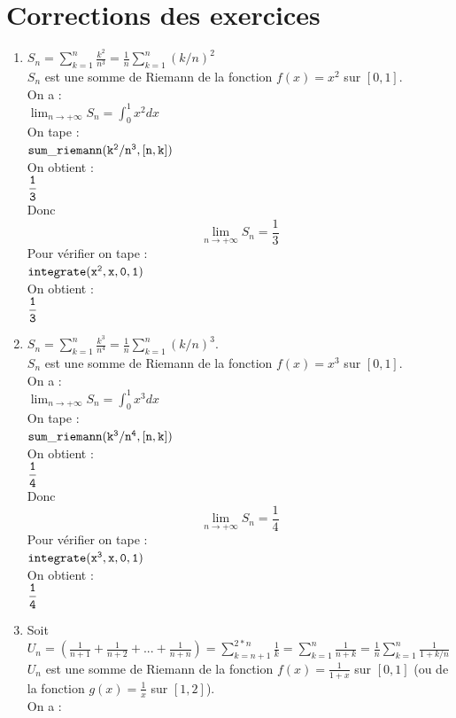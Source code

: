 \documentclass[a4paper,11pt]{book}
\begin{document}
\section{Corrections des exercices}
\begin{enumerate} 
\item
$\displaystyle S_n=\sum_{k=1}^n \frac{k^2}{n^3}=\frac{1}{n}\sum_{k=1}^n (k/n)^2$\\
$S_n$ est une somme de Riemann de la fonction $f(x)=x^2$ sur $[0,1]$.\\
On a :\\
$\displaystyle \lim_{n \rightarrow +\infty} S_n=\int_0^1 x^2 dx$\\
On tape :\\
${\tt sum\_riemann(k^2/n^3,[n,k])}$\\
On obtient :\\
${\tt \displaystyle \frac{1}{3}}$\\
Donc $$\displaystyle \lim_{n \rightarrow +\infty} S_n=\frac{1}{3}$$
Pour v\'erifier on tape :\\
${\tt integrate(x^2,x,0,1)}$\\
On obtient :\\
${\tt \displaystyle \frac{1}{3}}$\\
\item
$\displaystyle S_n=\sum_{k=1}^n \frac{k^3}{n^4}=\frac{1}{n}\sum_{k=1}^n (k/n)^3$.\\
$S_n$ est une somme de Riemann de la fonction $f(x)=x^3$ sur $[0,1]$.\\
On a :\\
$\displaystyle \lim_{n \rightarrow +\infty} S_n=\int_0^1 x^3 dx$\\
On tape :\\
${\tt sum\_riemann(k^3/n^4,[n,k])}$\\
On obtient :\\
${\tt \displaystyle \frac{1}{4}}$\\
Donc $$\displaystyle \lim_{n \rightarrow +\infty} S_n=\frac{1}{4}$$
Pour v\'erifier on tape :\\
${\tt integrate(x^3,x,0,1)}$\\
On obtient :\\
${\tt \displaystyle \frac{1}{4}}$\\
\item
Soit $\displaystyle U_n=(\frac{1}{n+1}+\frac{1}{n+2}+...+\frac{1}{n+n})=\sum_{k=n+1}^{2*n} \frac{1}{k}=\sum_{k=1}^n \frac{1}{n+k}=\frac{1}{n}\sum_{k=1}^n \frac{1}{1+k/n}$\\
$U_n$ est une somme de Riemann de la fonction $\displaystyle f(x)=\frac{1}{1+x}$ sur $[0,1]$ (ou de la fonction $\displaystyle g(x)=\frac{1}{x}$ sur $[1,2]$).\\On a :\\

\end{enumerate}
\end{document}
